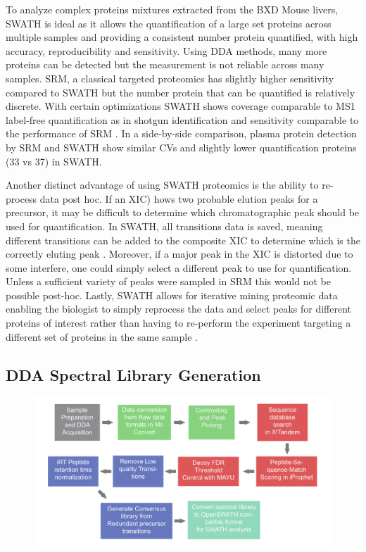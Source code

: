 \documentclass[a4paper,11pt,twoside]{book}
\begin{document}
    To analyze complex proteins mixtures extracted from the BXD Mouse livers, SWATH is ideal as it allows the quantification of a large set proteins across multiple samples and providing a consistent number protein quantified, with high accuracy, reproducibility and sensitivity. Using DDA methods, many more proteins can be detected but the measurement is not reliable across many samples. SRM, a classical targeted proteomics has slightly higher sensitivity compared to SWATH but the number protein that can be quantified is relatively discrete. With certain optimizations SWATH shows coverage comparable to MS1 label-free quantification as in shotgun identification and sensitivity comparable to the performance of SRM \citep{Liu2013QuantitativeSWATH-MS}. In a side-by-side comparison, plasma protein detection by SRM and SWATH \citep{Liu2013QuantitativeSWATH-MS} show similar CVs and slightly lower quantification proteins (33 vs 37) in SWATH. 
	
    Another distinct advantage of using SWATH proteomics is the ability to re-process data post hoc. If an XIC) hows two probable elution peaks for a precursor, it may be difficult to determine which chromatographic peak should be used for quantification. In SWATH, all transitions data is saved, meaning different transitions can be added to the composite XIC to determine which is the correctly eluting peak \citep{Gillet2012TargetedAnalysis}. Moreover, if a major peak in the XIC is distorted due to some interfere, one could simply select a different peak to use for quantification. Unless a sufficient variety of peaks were sampled in SRM this would not be possible post-hoc\citep{Gillet2012TargetedAnalysis}. Lastly, SWATH allows for iterative mining proteomic data enabling the biologist to simply reprocess the data and select peaks for different proteins of interest rather than having to re-perform the experiment targeting a different set of proteins in the same sample \citep{Gillet2012TargetedAnalysis}.	
	
	
	\subsection{DDA Spectral Library Generation}
	
	\begin{figure}[ht]
		\centering
		\includegraphics[width=\linewidth]{3.Proteomics/Spectral_Library_Gen.pdf}
		\label{Spectral Library Generation Road Map}
	\end{figure}
	
\end{document}

